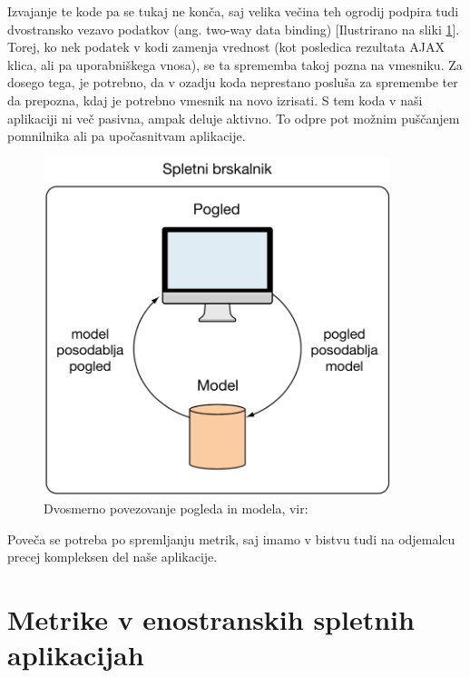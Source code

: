 \documentclass[a4paper, 12pt]{book}
\begin{document}
Izvajanje te kode pa se tukaj ne konča, saj velika večina teh ogrodij podpira tudi dvostransko vezavo podatkov (ang. two-way data binding) [Ilustrirano na sliki \ref{img:angularjs_two_way_databind}]. Torej, ko nek podatek v kodi zamenja vrednost (kot posledica rezultata AJAX klica, ali pa uporabniškega vnosa), se ta sprememba takoj pozna na vmesniku. Za dosego tega, je potrebno, da v ozadju koda neprestano posluša za spremembe ter da prepozna, kdaj je potrebno vmesnik na novo izrisati. S tem koda v naši aplikaciji ni več pasivna, ampak deluje aktivno. To odpre pot možnim puščanjem pomnilnika ali pa upočasnitvam aplikacije.

\begin{figure}[h]
	\begin{center}
		\includegraphics[width=0.9\textwidth]{AngularJS_dvosmerno_povezovanje.png}
	\end{center}
	\caption{Dvosmerno povezovanje pogleda in modela, vir: \cite{sp_skripta}}
	\label{img:angularjs_two_way_databind}
\end{figure}

Poveča se potreba po spremljanju metrik, saj imamo v bistvu tudi na odjemalcu precej kompleksen del naše aplikacije.

\section{Metrike v enostranskih spletnih aplikacijah}
\end{document}
